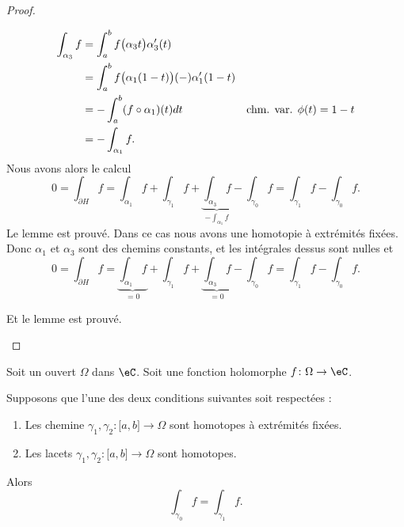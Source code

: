 \begin{proof}
\begin{subproof}
\begin{subproof}
\begin{subequations}
            \begin{align}
                \int_{\alpha_3}f&=\int_a^bf\big( \alpha_3t \big)\alpha_3'(t)\\
                &=\int_a^bf\big( \alpha_1(1-t) \big)(-)\alpha_1'(1-t)\\
                &=-\int_a^b(f\circ\alpha_1)(t)dt        &\text{chm. var. \( \phi(t)=1-t\)}\\
                &=-\int_{\alpha_1}f.
            \end{align}
        \end{subequations}
        Nous avons alors le calcul
        \begin{equation}
            0=\int_{\partial H}f=\int_{\alpha_1}f+\int_{\gamma_1}f+\underbrace{\int_{\alpha_3}f}_{-\int_{\alpha_1}f}-\int_{\gamma_0}f=\int_{\gamma_1}f-\int_{\gamma_0}f.
        \end{equation}
        Le lemme est prouvé.
    Dans ce cas nous avons une homotopie à extrémités fixées. Donc \( \alpha_1\) et \( \alpha_3\) sont des chemins constants, et les intégrales dessus sont nulles et
        \begin{equation}
            0=\int_{\partial H}f=\underbrace{\int_{\alpha_1}f}_{=0}+\int_{\gamma_1}f+\underbrace{\int_{\alpha_3}f}_{=0}-\int_{\gamma_0}f=\int_{\gamma_1}f-\int_{\gamma_0}f.
        \end{equation}
    \end{subproof}
    Et le lemme est prouvé.
    \end{subproof}
\end{proof}


\begin{theorem}     \label{THOooVTFXooBgvVyD}
    Soit un ouvert \( \Omega\) dans \( \eC\). Soit une fonction holomorphe \( f\colon \Omega\to \eC\). 

    Supposons que l'une des deux conditions suivantes soit respectées :
    \begin{enumerate}
        \item
        Les chemine \( \gamma_1,\gamma_2\colon \mathopen[ a , b \mathclose]\to \Omega \) sont homotopes à extrémités fixées. 
    \item
        Les lacets \( \gamma_1,\gamma_2\colon \mathopen[ a , b \mathclose]\to \Omega \) sont homotopes.
    \end{enumerate}
    Alors
    \begin{equation}
        \int_{\gamma_0}f=\int_{\gamma_1}f.
    \end{equation}
\end{theorem}

